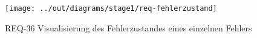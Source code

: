 \begin{figure}[h]
    \centering
    \texttt{[image: ../out/diagrams/stage1/req-fehlerzustand]}
    \caption{REQ-36 Visualisierung des Fehlerzustandes eines einzelnen Fehlers}
    \label{fig:stm-fehlerzustand}
\end{figure}
